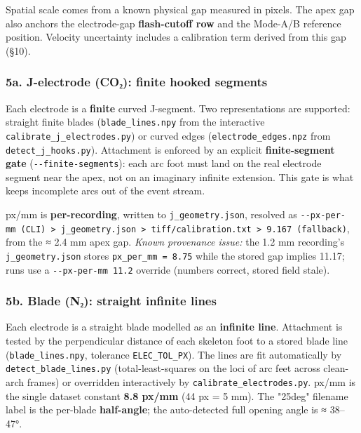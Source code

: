\documentclass[
  11pt,
]{article}
\begin{document}
Spatial scale comes from a known physical gap measured in pixels. The
apex gap also anchors the electrode-gap \textbf{flash-cutoff row} and
the Mode-A/B reference position. Velocity uncertainty includes a
calibration term derived from this gap (§10).

\hypertarget{5a-j-electrode-coux2082-finite-hooked-segments}{%
\subsubsection{5a. J-electrode (CO₂): finite hooked
segments}\label{5a-j-electrode-coux2082-finite-hooked-segments}}

Each electrode is a \textbf{finite} curved J-segment. Two
representations are supported: straight finite blades
(\texttt{blade\_lines.npy} from the interactive
\texttt{calibrate\_j\_electrodes.py}) or curved edges
(\texttt{electrode\_edges.npz} from \texttt{detect\_j\_hooks.py}).
Attachment is enforced by an explicit \textbf{finite-segment gate}
(\texttt{-\/-finite-segments}): each arc foot must land on the real
electrode segment near the apex, not on an imaginary infinite extension.
This gate is what keeps incomplete arcs out of the event stream.

px/mm is \textbf{per-recording}, written to \texttt{j\_geometry.json},
resolved as
\texttt{-\/-px-per-mm\ (CLI)\ \textgreater{}\ j\_geometry.json\ \textgreater{}\ tiff/calibration.txt\ \textgreater{}\ 9.167\ (fallback)},
from the ≈ 2.4 mm apex gap. \emph{Known provenance issue:} the 1.2 mm
recording's \texttt{j\_geometry.json} stores
\texttt{px\_per\_mm\ =\ 8.75} while the stored gap implies 11.17; runs
use a \texttt{-\/-px-per-mm\ 11.2} override (numbers correct, stored
field stale).

\hypertarget{5b-blade-nux2082-straight-infinite-lines}{%
\subsubsection{5b. Blade (N₂): straight infinite
lines}\label{5b-blade-nux2082-straight-infinite-lines}}

Each electrode is a straight blade modelled as an \textbf{infinite
line}. Attachment is tested by the perpendicular distance of each
skeleton foot to a stored blade line (\texttt{blade\_lines.npy},
tolerance \texttt{ELEC\_TOL\_PX}). The lines are fit automatically by
\texttt{detect\_blade\_lines.py} (total-least-squares on the loci of arc
feet across clean-arch frames) or overridden interactively by
\texttt{calibrate\_electrodes.py}. px/mm is the single dataset constant
\textbf{8.8 px/mm} (44 px = 5 mm). The "25deg" filename label is the
per-blade \textbf{half-angle}; the auto-detected full opening angle is ≈
38--47°.
\end{document}
